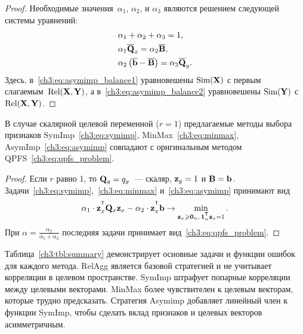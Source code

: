 \begin{proof}
	Необходимые значения~$\alpha_1$, $\alpha_2$, и $\alpha_3$ являются решением следующей системы уравнений:
	\begin{align}
		&\alpha_1 + \alpha_2 + \alpha_3 = 1, \\
		&\alpha_1 \overline{\mathbf{Q}}_x = \alpha_2 \overline{\mathbf{B}}, \label{ch3:eq:asymimp_balance1}\\
		&\alpha_2 \left(\overline{\mathbf{b}} - \overline{\mathbf{B}} \right) = \alpha_3 \overline{\mathbf{Q}}_y.
		\label{ch3:eq:asymimp_balance2}
	\end{align}
	Здесь, в~\eqref{ch3:eq:asymimp_balance1} уравновешены $\text{Sim}(\mathbf{X})$ с первым слагаемым~$\text{Rel}(\mathbf{X}, \mathbf{Y})$, а в~\eqref{ch3:eq:asymimp_balance2} уравновешены $\text{Sim}(\mathbf{Y})$  с~$\text{Rel}(\mathbf{X}, \mathbf{Y})$.
\end{proof}
\begin{theorem}
	В случае скалярной целевой переменной ($r=1$) предлагаемые методы выбора признаков SymImp~\eqref{ch3:eq:symimp}, MinMax~\eqref{ch3:eq:minmax}, AsymImp~\eqref{ch3:eq:asymimp} совпадают с оригинальным методом QPFS~\eqref{ch3:eq:qpfs_problem}.
\end{theorem}	
\begin{proof}
	Если $r$ равно 1, то $\mathbf{Q}_y = q_y$~--- скаляр, $\mathbf{z}_y = 1$ и $\mathbf{B} = \mathbf{b}$. Задачи~\eqref{ch3:eq:symimp},~\eqref{ch3:eq:minmax} и~\eqref{ch3:eq:asymimp} принимают вид
	\begin{equation*}
	\alpha_1 \cdot \bz_x^{\T} \bQ_x \bz_x - \alpha_2 \cdot \bz_x^{\T} \bb \rightarrow \min_{\bz_x \geq \bZero_n, \, \bOne_n^{\T}\bz_x=1} .
	\end{equation*}
	При $\alpha = \frac{\alpha_2}{\alpha_1 + \alpha_2}$ последняя задачи принимает вид~\eqref{ch3:eq:qpfs_problem}.
\end{proof}

Таблица~\ref{ch3:tbl:summary} демонстрирует основные задачи и функции ошибок для каждого метода. 
RelAgg является базовой стратегией и не учитывает корреляции в целевом пространстве.
SymImp штрафует попарные корреляции между целевыми векторами.
MinMax более чувствителен к целевым векторам, которые трудно предсказать.
Стратегия Asymimp добавляет линейный член к функции SymImp, чтобы сделать вклад признаков и целевых векторов асимметричным.

